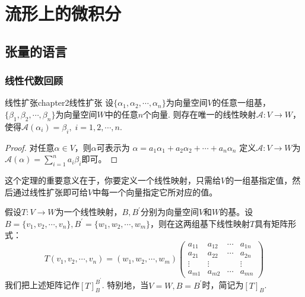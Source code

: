 
\chapter{流形上的微积分}

\section{张量的语言}

\subsection{线性代数回顾}
\label{线性代数回顾}

\begin{mythm}{线性扩张}{chapter2线性扩张}
	设$\{\alpha_{ 1 },\alpha_{ 2 },\cdots,\alpha_{ n } \}$为向量空间$V$的任意一组基，$\{\beta_{ 1 },\beta_{ 2 },\cdots,\beta_{ n } \}$为向量空间$W$中的任意$n$个向量. 则存在唯一的线性映射$\mathscr{A}:V\longrightarrow W$，使得$\mathscr{A}(\alpha_{ i })=\beta_{ i},\;i=1,2,\cdots,n$.
\end{mythm}
\begin{proof}
	对任意$\alpha\in V$，则$\alpha$可表示为
	$
	\alpha=a_{1}\alpha_{ 1 }+a_{2}\alpha_{ 2 }+\cdots+a_{n}\alpha_{ n }
	$
	定义$\mathscr{A}:V\longrightarrow W$为$\mathscr{A}(\alpha)=\sum_{i=1}^{n}a_{i}\beta_{ i}$即可。
\end{proof}
这个定理的重要意义在于，你要定义一个线性映射，只需给$V$的一组基指定值，然后通过线性扩张即可给$V$中每一个向量指定它所对应的值。

假设$T:V\rightarrow W$为一个线性映射，$B,B^{\prime}$分别为向量空间$V$和$W$的基。设$B=\{v_{1},v_{2},\cdots,v_{n} \},B^{\prime}=\{w_{1},w_{2},\cdots,w_{m} \}$，则在这两组基下线性映射$T$具有矩阵形式：
\[
T(v_{1},v_{2},\cdots,v_{n})=(w_{1},w_{2},\cdots,w_{m})\left( \begin{array}{cccc}{a_{11}} & {a_{12}} & {\cdots} & {a_{1 n}} \\ {a_{21}} & {a_{22}} & {\cdots} & {a_{2 n}} \\ {\vdots} & {\vdots} & { } & {\vdots} \\ {a_{m 1}} & {a_{m 2}} & {\cdots} & {a_{m n}}\end{array}\right)
\]
我们把上述矩阵记作$[T]_{B}^{B^{\prime}}$. 特别地，当$V=W,B=B^{\prime}$时，简记为$[T]_{B}$. 

